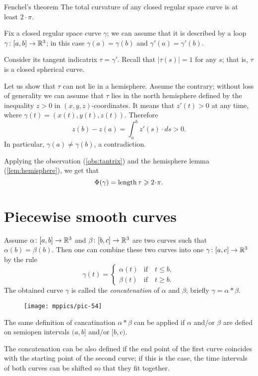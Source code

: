 \begin{thm}{Fenchel's theorem}\label{thm:fenchel}
The total curvature of any closed regular space curve is at least $2\cdot\pi$.
\end{thm}

Fix a closed regular space curve $\gamma$;
we can assume that it is described by a loop $\gamma\colon[a,b]\to \mathbb{R}^3$;
in this case $\gamma(a)=\gamma(b)$ and $\gamma'(a)=\gamma'(b)$.

Consider its tangent indicatrix $\tau=\gamma'$.
Recall that $|\tau(s)|=1$ for any $s$; that is, $\tau$ is a closed spherical curve.

Let us show that $\tau$ can not lie in a hemisphere.
Assume the contrary; without loss of generality we can assume that $\tau$ lies in the north hemisphere defined by the inequality $z>0$ in $(x,y,z)$-coordinates.
It means that $z'(t)>0$ at any time, where $\gamma(t)=(x(t), y(t), z(t))$.
Therefore 
\[z(b)-z(a)=\int_a^bz'(s)\cdot ds>0.\]
In particular, $\gamma(a)\ne \gamma(b)$, a contradiction.

Applying the observation (\ref{obs:tantrix}) and the hemisphere lemma (\ref{lem:hemisphere}), we get that 
\[\tc\gamma=\length \tau\ge2\cdot\pi.\]
\qedsf

\section*{Piecewise smooth curves}

Assume $\alpha\colon[a,b]\to \mathbb{R}^3$ and $\beta\:[b,c]\z\to \RR^3$ are two curves such that $\alpha(b)=\beta(b)$.
Then one can combine these two curves into one $\gamma\:[a,c]\z\to \RR^3$ by the rule 
\[\gamma(t)=
\begin{cases}
\alpha(t)&\text{if}\quad t\le b,
\\
\beta(t)&\text{if}\quad t\ge b.
\end{cases}
\]
The obtained curve $\gamma$ is called the 
\emph{concatenation} of $\alpha$ and $\beta$; briefly $\gamma=\alpha{*}\beta$.

\begin{wrapfigure}{r}{30 mm}
\vskip-0mm
\centering
\texttt{[image: mppics/pic-54]}
\end{wrapfigure}

The same definition of cancatination $\alpha{*}\beta$ can be applied if $\alpha$ and/or $\beta$ are defied on semiopen intervals 
$(a,b]$ and/or $[b,c)$.

The concatenation can be also defined if the end point of the first curve coincides with the starting point of the second curve; if this is the case, the time intervals of both curves can be shifted so that they fit together. 

